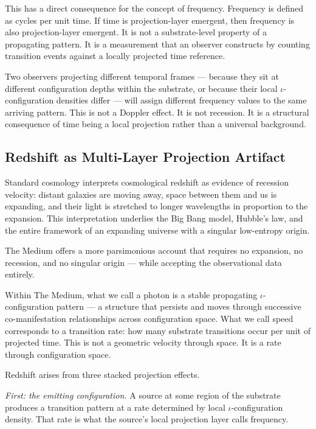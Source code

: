 \documentclass[11pt,letterpaper]{article}
\begin{document}
This has a direct consequence for the concept of frequency. Frequency is defined as cycles per unit time. If time is projection-layer emergent, then frequency is also projection-layer emergent. It is not a substrate-level property of a propagating pattern. It is a measurement that an observer constructs by counting transition events against a locally projected time reference.

Two observers projecting different temporal frames --- because they sit at different configuration depths within the substrate, or because their local \(\iota\)-configuration densities differ --- will assign different frequency values to the same arriving pattern. This is not a Doppler effect. It is not recession. It is a structural consequence of time being a local projection rather than a universal background.
\subsection{Redshift as Multi-Layer Projection Artifact}
\label{sec:org2d29f9d}

Standard cosmology interprets cosmological redshift as evidence of recession velocity: distant galaxies are moving away, space between them and us is expanding, and their light is stretched to longer wavelengths in proportion to the expansion. This interpretation underlies the Big Bang model, Hubble's law, and the entire framework of an expanding universe with a singular low-entropy origin.

The Medium offers a more parsimonious account that requires no expansion, no recession, and no singular origin --- while accepting the observational data entirely.

Within The Medium, what we call a photon is a stable propagating \(\iota\)-configuration pattern --- a structure that persists and moves through successive co-manifestation relationships across configuration space. What we call speed corresponds to a transition rate: how many substrate transitions occur per unit of projected time. This is not a geometric velocity through space. It is a rate through configuration space.

Redshift arises from three stacked projection effects.

\emph{First: the emitting configuration.} A source at some region of the substrate produces a transition pattern at a rate determined by local \(\iota\)-configuration density. That rate is what the source's local projection layer calls frequency.
\end{document}
